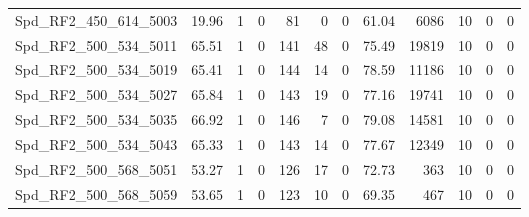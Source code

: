 \begin{longtable}[c]{@{}lrrrrrrrrrrr@{}}
Spd\_RF2\_450\_614\_5003     & 19.96                  & 1                       & 0                       & 81                     & 0                       & 0                       & 61.04                   & 6086                     & 10                       & 0                        & 0                        \\
Spd\_RF2\_500\_534\_5011     & 65.51                  & 1                       & 0                       & 141                    & 48                      & 0                       & 75.49                   & 19819                    & 10                       & 0                        & 0                        \\
Spd\_RF2\_500\_534\_5019     & 65.41                  & 1                       & 0                       & 144                    & 14                      & 0                       & 78.59                   & 11186                    & 10                       & 0                        & 0                        \\
Spd\_RF2\_500\_534\_5027     & 65.84                  & 1                       & 0                       & 143                    & 19                      & 0                       & 77.16                   & 19741                    & 10                       & 0                        & 0                        \\
Spd\_RF2\_500\_534\_5035     & 66.92                  & 1                       & 0                       & 146                    & 7                       & 0                       & 79.08                   & 14581                    & 10                       & 0                        & 0                        \\
Spd\_RF2\_500\_534\_5043     & 65.33                  & 1                       & 0                       & 143                    & 14                      & 0                       & 77.67                   & 12349                    & 10                       & 0                        & 0                        \\
Spd\_RF2\_500\_568\_5051     & 53.27                  & 1                       & 0                       & 126                    & 17                      & 0                       & 72.73                   & 363                      & 10                       & 0                        & 0                        \\
Spd\_RF2\_500\_568\_5059     & 53.65                  & 1                       & 0                       & 123                    & 10                      & 0                       & 69.35                   & 467                      & 10                       & 0                        & 0                        \\

\end{longtable}
